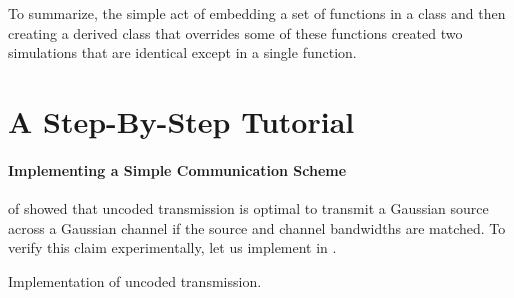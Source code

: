 To summarize, the simple act of  embedding a set of functions in a class and
then creating a derived class that overrides some of these functions created two
simulations that are identical except in a single function. 


\section{A Step-By-Step Tutorial}

\paragraph{Implementing a Simple Communication Scheme}

 of  showed that uncoded transmission is
optimal to transmit a Gaussian source across a Gaussian channel if the source
and channel bandwidths are matched. To verify this claim experimentally, let us
implement  in \jscsim. 

\begin{listing}
  \caption{Implementation of uncoded transmission.}
  \label{lst:uncoded}
\end{listing}

